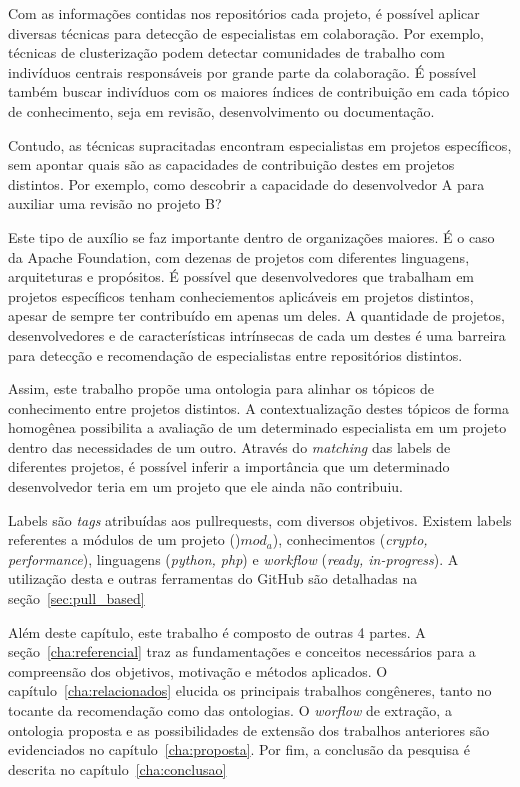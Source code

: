 \documentclass[a4paper,12pt]{monografia}
\theoremstyle{plain}
\theoremstyle{definition}
\theoremstyle{remark}
\begin{document}
Com as informações contidas nos repositórios cada projeto, é possível aplicar diversas técnicas para detecção de especialistas em colaboração. Por exemplo, técnicas de clusterização podem detectar comunidades de trabalho com indivíduos centrais responsáveis por grande parte da colaboração. É possível também buscar indivíduos com os maiores índices de contribuição em cada tópico de conhecimento, seja em revisão, desenvolvimento ou documentação.

Contudo, as técnicas supracitadas encontram especialistas em projetos específicos, sem apontar quais são as capacidades de contribuição destes em projetos distintos. Por exemplo, como descobrir a capacidade do desenvolvedor A para auxiliar uma revisão no projeto B?

Este tipo de auxílio se faz importante dentro de organizações maiores. É o caso da Apache Foundation, com dezenas de projetos com diferentes linguagens, arquiteturas e propósitos. É possível que desenvolvedores que trabalham em projetos específicos tenham conheciementos aplicáveis em projetos distintos, apesar de sempre ter contribuído em apenas um deles. A quantidade de projetos, desenvolvedores e de características intrínsecas de cada um destes é uma barreira para detecção e recomendação de especialistas entre repositórios distintos.

Assim, este trabalho propõe uma ontologia para alinhar os tópicos de conhecimento entre projetos distintos. A contextualização destes tópicos de forma homogênea possibilita a avaliação de um determinado especialista em um projeto dentro das necessidades de um outro. Através do \textit{matching} das labels de diferentes projetos, é possível inferir a importância que um determinado desenvolvedor teria em um projeto que ele ainda não contribuiu.

Labels são \textit{tags} atribuídas aos pullrequests, com diversos objetivos. Existem labels referentes a módulos de um projeto ()\textit{$mod_a$}), conhecimentos (\textit{crypto, performance}), linguagens (\textit{python, php}) e \textit{workflow} (\textit{ready, in-progress}). A utilização desta e outras ferramentas do GitHub são detalhadas na seção~\ref{sec:pull_based}

Além deste capítulo, este trabalho é composto de outras 4 partes. A seção~\ref{cha:referencial} traz as fundamentações e conceitos necessários para a compreensão dos objetivos, motivação e métodos aplicados. O capítulo~\ref{cha:relacionados} elucida os principais trabalhos congêneres, tanto no tocante da recomendação como das ontologias. O \textit{worflow} de extração, a ontologia proposta e as possibilidades de extensão dos trabalhos anteriores são evidenciados no capítulo~\ref{cha:proposta}. Por fim, a conclusão da pesquisa é descrita no capítulo~\ref{cha:conclusao}
\end{document}
